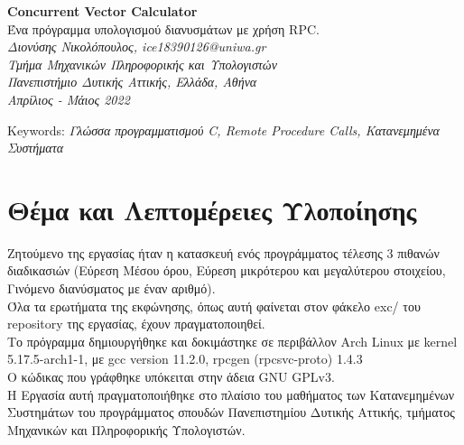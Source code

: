 \thispagestyle{empty}
\begin{center}
    \huge{
        \textbf{
            \color{brown}Concurrent Vector Calculator\color{black}
            \vspace{5mm}
        }
    }\\
    \large{Ένα πρόγραμμα υπολογισμού διανυσμάτων με χρήση RPC.}
    \vspace{5mm}\\
    \small{\emph{
    Διονύσης Νικολόπουλος, ice18390126@uniwa.gr
    \\
    Τμήμα Μηχανικών Πληροφορικής και Υπολογιστών
    \\
    Πανεπιστήμιο Δυτικής Αττικής, Ελλάδα, Αθήνα
    \\
    Απρίλιος - Μάιος 2022
    \\
    }}
    \vspace*{5mm}
\end{center}
\footnotesize
Keywords: \emph{Γλώσσα προγραμματισμού C, Remote Procedure Calls, Κατανεμημένα
Συστήματα}
\normalsize


\section*{Θέμα και Λεπτομέρειες Υλοποίησης}
\begin{addmargin}[2em]{3em}%
\footnotesize{
    Ζητούμενο της εργασίας ήταν η κατασκευή ενός προγράμματος τέλεσης 3 πιθανών
    διαδικασιών (Εύρεση Μέσου όρου, Εύρεση μικρότερου και μεγαλύτερου στοιχείου,
    Γινόμενο διανύσματος με έναν αριθμό).
    \\
    Όλα τα ερωτήματα της εκφώνησης, όπως αυτή φαίνεται στον φάκελο exc/ του
    repository της εργασίας, έχουν πραγματοποιηθεί.
    \\
    Το πρόγραμμα δημιουργήθηκε και δοκιμάστηκε σε περιβάλλον Arch Linux
    με kernel 5.17.5-arch1-1, με gcc version 11.2.0, rpcgen (rpcsvc-proto) 1.4.3
    \\
    Ο κώδικας που γράφθηκε υπόκειται στην άδεια GNU GPLv3.
    \\
    Η Εργασία αυτή πραγματοποιήθηκε στο πλαίσιο του μαθήματος των Κατανεμημένων
    Συστημάτων του προγράμματος σπουδών Πανεπιστημίου Δυτικής Αττικής, τμήματος
    Μηχανικών και Πληροφορικής Υπολογιστών.
}
\end{addmargin}
